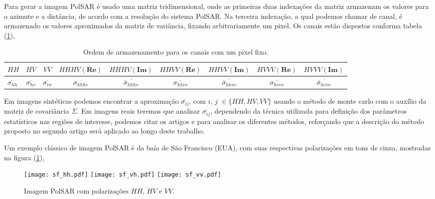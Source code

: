 Para gerar a imagem PolSAR é usado uma matriz tridimensional, onde as primeiras duas indexações da matriz armazenam os valores para o azimute e a distância, de acordo com a resolução do sistema PolSAR. Na terceira indexação, a qual podemos chamar de canal, é armazenado os valores aproximados da  matriz de variância, fixando arbitrariamente um pixel. Os canais estão dispostos conforma tabela (\ref{cap_acf_tab05}),
\begin{table}[hbt]
	\footnotesize
	\centering
	\caption{Ordem de armazenamento para os canais com um pixel fixo.}\label{cap_acf_tab05}
\begin{tabular}{@{}lcccccccc@{}} \toprule
	 $HH$ &$HV$&$VV$ &$HHHV(\mathbf{Re})$ &$HHHV(\mathbf{Im})$&$HHVV(\mathbf{Re})$&$HHVV(\mathbf{Im})$ &$HVVV(\mathbf{Re})$&  $HVVV(\mathbf{Im})$ \\ \midrule
	$\overline{\sigma_{hh}}$&$\overline{\sigma_{hv}}$&$\overline{\sigma_{vv}}$&$\overline{\sigma_{hhhv}}$&$\overline{\bar{\sigma}_{hhhv}}$&$\overline{\sigma_{hhvv}}$&$\overline{\bar{\sigma}_{hhvv}}$&$\overline{\sigma_{hvvv}}$&$\overline{\bar{\sigma}_{hvvv}}$\\ \bottomrule
\end{tabular}
\end{table}

Em imagens sintéticas podemos encontrar a aproximação $\overline{\sigma_{ij}}$, com $i$, $j$ $\in \{HH,HV,VV\}$ usando o método de monte carlo com o auxílio da matriz de covariância $\Sigma$. Em imagens reais teremos que analisar $\overline{\sigma_{ij}}$, dependendo da técnica utilizada para definição dos parâmetros estatísticos nas regiões de interesse, podemos citar os artigos \citep{gmbf} e \citep{nhfc} para analisar os diferentes métodos, reforçando que a descrição do método proposto no segundo artigo será aplicado ao longo deste trabalho.

Um exemplo clássico de imagem PolSAR é da baía de São Francisco (EUA), com suas respectivas polarizações em tons de cinza, mostradas na figura (\ref{cap_acf_sf_hh_hv_vv}), 
\begin{figure}[hbt]
  \texttt{[image: sf\_hh.pdf]}
\endminipage
{}
	\texttt{[image: sf\_vh.pdf]}
\endminipage
\centering
{}
	\texttt{[image: sf\_vv.pdf]}
\endminipage
        \vspace{-2.0cm}
	\caption{Imagem PolSAR com polarizações $HH$, $HV$ e $VV$.}\label{cap_acf_sf_hh_hv_vv}
\end{figure}

